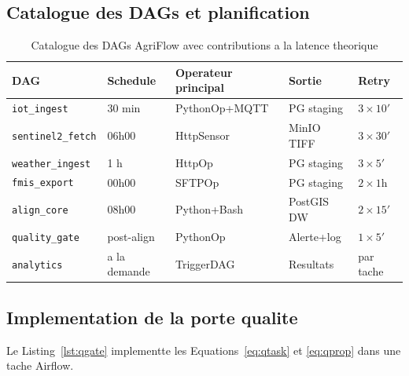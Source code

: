 \documentclass[12pt,a4paper]{article}
\theoremstyle{plain}
\theoremstyle{definition}
\theoremstyle{remark}
\begin{document}
\subsection{Catalogue des DAGs et planification}

\begin{table}[H]
\caption{Catalogue des DAGs AgriFlow avec contributions a la latence theorique}
\label{tab:dags}
\centering\small
\renewcommand{\arraystretch}{1.35}
\begin{tabularx}{\linewidth}{lllXl}
\toprule
\textbf{DAG} & \textbf{Schedule} & \textbf{Operateur principal} &
\textbf{Sortie} & \textbf{Retry} \\
\midrule
\rowcolor{lightblue!40}
\texttt{iot\_ingest}      & 30 min & PythonOp+MQTT & PG staging & $3\times10'$ \\
\texttt{sentinel2\_fetch} & 06h00  & HttpSensor    & MinIO TIFF & $3\times30'$ \\
\rowcolor{lightblue!40}
\texttt{weather\_ingest}  & 1 h    & HttpOp        & PG staging & $3\times5'$  \\
\texttt{fmis\_export}     & 00h00  & SFTPOp        & PG staging & $2\times1$h  \\
\rowcolor{lightblue!40}
\texttt{align\_core}      & 08h00  & Python+Bash   & PostGIS DW & $2\times15'$ \\
\texttt{quality\_gate}    & post-align & PythonOp  & Alerte+log & $1\times5'$  \\
\rowcolor{lightblue!40}
\texttt{analytics}        & a la demande & TriggerDAG & Resultats & par tache  \\
\bottomrule
\end{tabularx}
\end{table}

\subsection{Implementation de la porte qualite}

Le Listing~\ref{lst:qgate} implementte les Equations~\eqref{eq:qtask}
et \eqref{eq:qprop} dans une tache Airflow.
\end{document}
